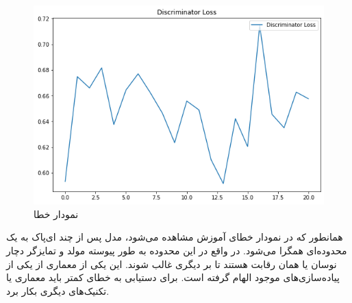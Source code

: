 \documentclass{article}
\begin{document}
\begin{figure}[!h]
    \centering\includegraphics[scale=.55]{./loss-2}
    \caption{نمودار خطا}\label{fig.36}
\end{figure}

همانطور که در نمودار خطای آموزش مشاهده می‌شود، مدل پس از چند ای‌پاک به یک محدوده‌ای همگرا می‌شود. در واقع در این محدوده به طور پیوسته مولد و تمایزگر دچار نوسان یا همان رقابت هستند تا بر دیگری غالب شوند. این یکی از معماری از یکی از پیاده‌سازی‌های موجود الهام گرفته است. برای دستیابی به خطای کمتر باید معماری یا تکنیک‌های دیگری بکار برد.




\end{document}

